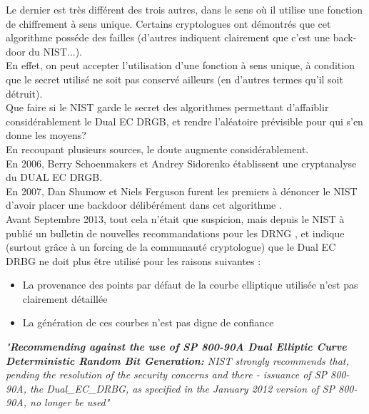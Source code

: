 	Le dernier est très différent des trois autres, dans le sens où il utilise 
	une fonction de chiffrement à sens unique. Certains cryptologues ont 
	démontrés que cet algorithme posséde des failles (d'autres indiquent 
	clairement que c'est une back-door du NIST...).\\
	
	En effet, on peut accepter l'utilisation d'une fonction à sens unique, à 
	condition que le secret utilisé ne soit pas conservé ailleurs (en d'autres 
	termes qu'il soit détruit).\\

	Que faire si le NIST garde le secret des algorithmes permettant 
	d'affaiblir considérablement le Dual EC DRGB, et rendre l'aléatoire 
	prévisible pour qui s'en donne les moyens?\\

	En recoupant plusieurs sources, le doute augmente considérablement.\\

	En 2006, Berry Schoenmakers et Andrey Sidorenko établissent une 
	cryptanalyse du DUAL EC DRGB. \cite{dualecrbg2006berry}\\
	
	En 2007, Dan Shumow et Niels Ferguson furent les premiers à dénoncer le 
	NIST d'avoir placer une backdoor délibérément dans cet algorithme
	\cite{shumow2007nist}.\\
	
	Avant Septembre 2013, tout cela n'était que suspicion, mais depuis le 
	NIST à publié un bulletin de nouvelles recommandations pour les DRNG
	\cite{newRecomendingNist}, et indique (surtout grâce à un forcing de 
	la communauté cryptologue) que le Dual EC DRBG ne doit plus être utilisé 
	pour les raisons suivantes :\\
	\begin{itemize}
		\item La provenance des points par défaut de la courbe elliptique 
		utilisée n'est pas clairement détaillée
		\item La génération de ces courbes n'est pas digne de confiance\\
	\end{itemize}
	\textit{"\textbf{Recommending against the use of SP 800-90A Dual Elliptic 
	Curve Deterministic Random Bit Generation:} NIST strongly recommends that, 
	pending the resolution of the security concerns and there - issuance of SP 
	800-90A, the Dual\_EC\_DRBG, as specified in the January 2012 version of 
	SP 800-90A, no longer be used"}\\

